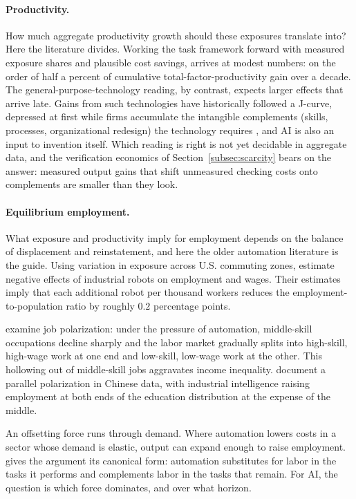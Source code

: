 \documentclass[12pt]{article}
\theoremstyle{plain}
\theoremstyle{definition}
\theoremstyle{remark}
\begin{document}
\paragraph{Productivity.} How much aggregate productivity growth should
these exposures translate
into? Here the literature divides. Working the task framework forward
with measured exposure shares and plausible cost savings,
\citet{Acemoglu2024SimpleMacroAI} arrives at modest numbers: on the
order of half a percent of cumulative total-factor-productivity gain
over a decade. The general-purpose-technology reading, by contrast,
expects larger effects that arrive late. Gains from such technologies have
historically followed a J-curve, depressed at first while firms
accumulate the intangible complements (skills, processes,
organizational redesign) the technology requires
\citep{BrynjolfssonRockSyverson2019, BrynjolfssonRockSyverson2021}, and
AI is also an input to invention itself. Which reading is right
is not yet decidable in aggregate data, and the verification economics
of Section~\ref{subsec:scarcity} bears on the answer: measured output
gains that shift unmeasured checking costs onto complements are smaller
than they look.

\paragraph{Equilibrium employment.} What exposure and productivity
imply for employment depends on the balance of displacement and
reinstatement, and here the older automation literature is the guide.
Using variation in exposure across U.S. commuting zones,
\citet{AcemogluRestrepo2020Robots} estimate negative effects of industrial
robots on employment and wages. Their estimates imply that each
additional robot per thousand workers reduces the employment-to-population
ratio by roughly $0.2$ percentage points.

\citet{AutorDorn2013} examine job polarization: under the pressure of
automation, middle-skill occupations decline sharply and the labor market
gradually splits into high-skill, high-wage work at one end and low-skill,
low-wage work at the other. This hollowing out of middle-skill jobs
aggravates income inequality. \citet{SunHou2019IndustrialAI} document a
parallel polarization in Chinese data, with industrial intelligence
raising employment at both ends of the education distribution at the
expense of the middle.

An offsetting force runs through demand. Where automation lowers costs
in a sector whose demand is elastic, output can expand enough to raise
employment. \citet{Autor2015JEP} gives the
argument its canonical form: automation substitutes for labor in the
tasks it performs and complements labor in the tasks that remain. For
AI, the question is which force dominates, and over what horizon.
\end{document}
